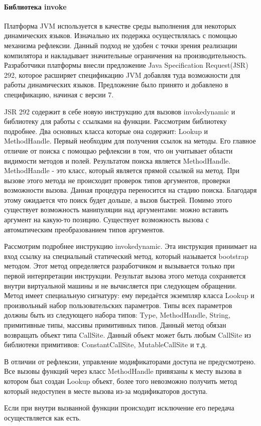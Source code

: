 \paragraph{Библиотека invoke}
Платформа JVM используется в качестве среды выполнения для некоторых динамических языков. Изначально их подержка осуществлялась с помощью механизма рефлексии. Данный подход не удобен с точки зрения реализации компилятора и накладывает значительные ограничения на производительность. Разработчики платформы внесли предложение Java Specification Request(JSR) 292, которое расширяет спецификацию JVM добавляя туда возможности для работы динамических языков\cite{jvm:jsr292}. Предложение было принято и добавлено в спецификацию, начиная с версии 7.

JSR 292 содержит в себе новую инструкцию для вызовов invokedynamic и библиотеку для работы с ссылками на функции. Рассмотрим библиотеку подробнее. Два основных класса которые она содержит: Lookup и MethodHandle. Первый необходим для получения ссылок на методы. Его главное отличие от поиска с помощью рефлексии в том, что он учитывает области видимости методов и полей. Результатом поиска является MethodHandle. MethodHandle - это класс, который является прямой ссылкой на метод. При вызове этого метода не происходит проверок типов аргументов, проверки возможности вызова. Данная процедура переносится на стадию поиска. Благодаря этому ожидается что поиск будет дольше, а вызов быстрей. Помимо этого существует возможность манипуляции над аргументами: можно вставить аргумент на какую-то позицию. Существует возможность вызова с автоматическим преобразованием типов аргументов.

Рассмотрим подробнее инструкцию invokedynamic. Эта инструкция принимает на вход ссылку на специальный статический метод, который называется bootstrap методом. Этот метод определяется разработчиком и вызывается только при первой интерпретации инструкции. Результат вызова этого метода сохраняется внутри виртуальной машины и не вычисляется при следующем обращении. Метод имеет специальную сигнатуру: ему передаётся экземпляр класса Lookup и произвольный набор пользовательских параметров. Типы всех параметров должны быть из следующего набора типов: Type, MethodHandle, String, примитивные типы, массивы примитивных типов. Данный метод обязан возвращать объект типа CallSite. Данный объект может быть любым CallSite из библиотеки примитивов: ConstantCallSite, MutableCallSite и т.д.

В отличии от рефлексии, управление модификаторами доступа не предусмотрено. Все вызовы функций через класс MethodHandle привязаны к месту вызова в котором был создан Lookup объект, более того невозможно получить метод который недоступен в месте вызова из-за модификаторов доступа.

Если при внутри вызванной функции происходит исключение его передача осуществляется как есть.
